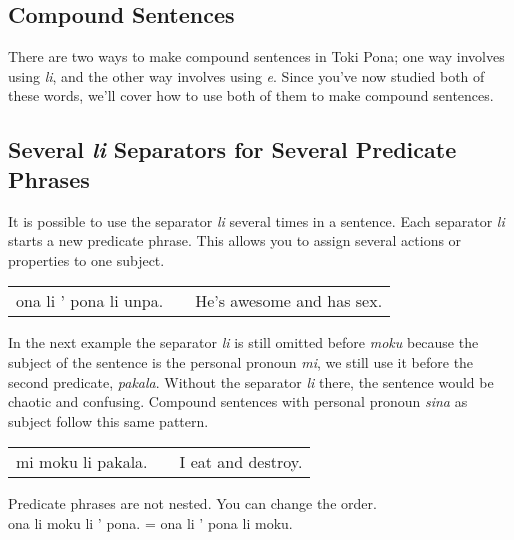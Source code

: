 {}
\label{'multiple_li'}
\subsection*{Compound Sentences}
%
There are two ways to make compound sentences in Toki Pona; one way involves using \textit{li}, and the other way involves using \textit{e}. 
Since you've now studied both of these words, we'll cover how to use both of them to make compound sentences. 

\subsection*{Several \textit{li} Separators for Several Predicate Phrases}
%

It is possible to use the separator \textit{li} several times in a sentence. 
Each separator \textit{li} starts a new predicate phrase. 
This allows you to assign several actions or properties to one subject. 

\begin{supertabular}{p{5,5cm}|ll}
ona li ' pona li unpa. && He's awesome and has sex. \\
\end{supertabular} 

In the next example the separator \textit{li} is still omitted before \textit{moku} because the subject of the sentence is the personal pronoun \textit{mi}, we still use it before the second predicate, \textit{pakala}. 
Without the separator \textit{li} there, the sentence would be chaotic and confusing. 
Compound sentences with personal pronoun \textit{sina} as subject follow this same pattern. 

\begin{supertabular}{p{5,5cm}|ll}
mi moku li pakala. && I eat and destroy. \\
\end{supertabular} 

Predicate phrases are not nested. You can change the order. \\
ona li moku li ' pona. = ona li ' pona li moku. 

